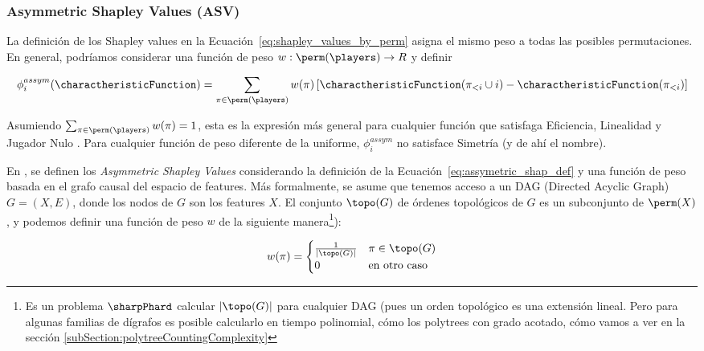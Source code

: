
\subsubsection{Asymmetric Shapley Values (ASV)}

La definición de los Shapley values en la Ecuación~\ref{eq:shapley_values_by_perm} asigna el mismo peso a todas las posibles permutaciones. En general, podríamos considerar una función de peso \(w:\perm(\players) \to R\) y definir

\begin{align}\label{eq:assymetric_shap_def}
   \phi_{i}^{assym}(\charactheristicFunction) = \sum_{\pi \in \perm(\players)} w(\pi) \left[ \charactheristicFunction(\pi_{<i} \cup {i}) - \charactheristicFunction(\pi_{<i}) \right] 
\end{align}

Asumiendo \(\sum_{\pi \in \perm(\players)} w(\pi) = 1\), esta es la expresión más general para cualquier función que satisfaga Eficiencia, Linealidad y Jugador Nulo \cite{frye2019asymmetric}. Para cualquier función de peso diferente de la uniforme, \(\phi_i^{assym}\) no satisface Simetría (y de ahí el nombre).

En \cite{frye2019asymmetric}, se definen los \textit{Asymmetric Shapley Values} considerando la definición de la Ecuación~\ref{eq:assymetric_shap_def} y una función de peso basada en el grafo causal del espacio de features. Más formalmente, se asume que tenemos acceso a un DAG (Directed Acyclic Graph) \(G = (X, E)\), donde los nodos de \(G\) son los features \(X\). El conjunto \(\topo(G)\) de órdenes topológicos de \(G\) es un subconjunto de \(\perm(X)\), y podemos definir una función de peso \(w\) de la siguiente manera\footnote{Es un problema $\sharpPhard$ calcular $|\topo(G)|$  para cualquier DAG \cite{countingLinearExtensions} (pues un orden topológico es una extensión lineal. Pero para algunas familias de dígrafos es posible calcularlo en tiempo polinomial, cómo los polytrees con grado acotado, cómo vamos a ver en la sección \ref{subSection:polytreeCountingComplexity} }):

\[
w(\pi) = \begin{cases}
\frac{1}{|\topo(G)|}  & \pi \in \topo(G) \\
0 & \text{en otro caso}
\end{cases}    
\]


